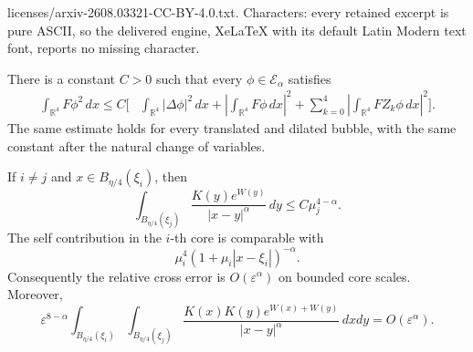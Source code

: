 \documentclass[10pt,a4paper]{amsart}
\begin{document}
licenses/arxiv-2608.03321-CC-BY-4.0.txt. Characters: every retained excerpt is pure ASCII, so the delivered engine, XeLaTeX with its default Latin Modern text font, reports no missing character.
\begin{lemma}\label{lem:weighted-low-mode-control}
There is a constant $C>0$ such that every
$\phi\in\mathcal E_\alpha$ satisfies
\begin{equation}\label{eq:weighted-low-mode-control}
\begin{aligned}
\int_{\mathbb R^4}F\phi^2\,dx
\leq C\Bigg[
&\int_{\mathbb R^4}|\Delta\phi|^2\,dx
+\left|\int_{\mathbb R^4}F\phi\,dx\right|^2+\sum_{k=0}^{4}
\left|\int_{\mathbb R^4}FZ_k\phi\,dx\right|^2
\Bigg].
\end{aligned}
\end{equation}
The same estimate holds for every translated and dilated bubble, with
the same constant after the natural change of variables.
\end{lemma}

\begin{lemma}\label{lem:separated-core-estimates}
If $i\ne j$ and $x\in B_{\eta/4}(\xi_i)$, then
\begin{equation*}
\int_{B_{\eta/4}(\xi_j)}
\frac{K(y)e^{W(y)}}{|x-y|^\alpha}\,dy
\leq C\mu_j^{4-\alpha}.
\end{equation*}
The self contribution in the $i$-th core is comparable with
\[
\mu_i^4(1+\mu_i|x-\xi_i|)^{-\alpha}.
\]
Consequently the relative cross error is $O(\varepsilon^\alpha)$ on bounded core scales. Moreover,
\begin{equation}\label{eq:separated-double}
\varepsilon^{8-\alpha}
\int_{B_{\eta/4}(\xi_i)}
\int_{B_{\eta/4}(\xi_j)}
\frac{K(x)K(y)e^{W(x)+W(y)}}{|x-y|^\alpha}\,dxdy
=O(\varepsilon^\alpha).
\end{equation}
\end{lemma}
\end{document}
